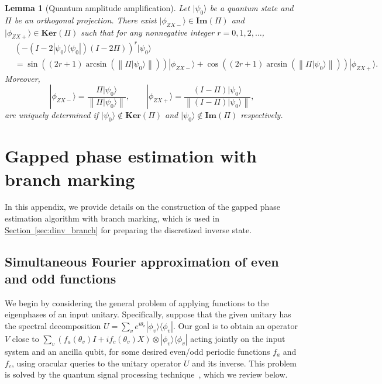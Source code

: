 \documentclass[letterpaper,onecolumn,11pt,accepted=2026-02-14]{quantumarticle}
\newcommand{\norm}[1]{\left\lVert#1\right\rVert}
\theoremstyle{remark}
\theoremstyle{plain}
\newtheorem*{lemma*}{Lemma}
\renewcommand{\sec}[1]{\hyperref[sec:#1]{Section~\ref*{sec:#1}}}
\newcommand{\ket}[1]{|#1\rangle}
\newcommand{\bra}[1]{\langle#1|}
\newcommand{\ketbra}[2]{\ket{#1}\!\bra{#2}}
\begin{document}
\begin{lemma*}[Quantum amplitude amplification]
Let $\ket{\psi_0}$ be a quantum state and $\Pi$ be an orthogonal projection. There exist $\ket{\phi_{ZX-}}\in\mathbf{Im}(\Pi)$ and $\ket{\phi_{ZX+}}\in\mathbf{Ker}(\Pi)$ such that for any nonnegative integer $r=0,1,2,\ldots$,
\begin{equation*}
\begin{aligned}
    &\left(-(I-2\ketbra{\psi_0}{\psi_0})(I-2\Pi)\right)^r\ket{\psi_0}\\
    &=\sin\left((2r+1)\arcsin(\norm{\Pi\ket{\psi_0}})\right)\ket{\phi_{ZX-}}
    +\cos\left((2r+1)\arcsin(\norm{\Pi\ket{\psi_0}})\right)\ket{\phi_{ZX+}}.
\end{aligned}
\end{equation*}
Moreover, 
\begin{equation*}
    \ket{\phi_{ZX-}}=\frac{\Pi\ket{\psi_0}}{\norm{\Pi\ket{\psi_0}}},\qquad
    \ket{\phi_{ZX+}}=\frac{(I-\Pi)\ket{\psi_0}}{\norm{(I-\Pi)\ket{\psi_0}}},
\end{equation*}
are uniquely determined if $\ket{\psi_0}\notin\mathbf{Ker}(\Pi)$ and $\ket{\psi_0}\notin\mathbf{Im}(\Pi)$ respectively.


\end{lemma*}

\section{Gapped phase estimation with branch marking}
\label{append:gpe_bm}

In this appendix, we provide details on the construction of the gapped phase estimation algorithm with branch marking, which is used in \sec{dinv_branch} for preparing the discretized inverse state.

\subsection{Simultaneous Fourier approximation of even and odd functions}
\label{append:gpe_bm_fourier}
We begin by considering the general problem of applying functions to the eigenphases of an input unitary. Specifically, suppose that the given unitary has the spectral decomposition $U=\sum_ve^{i\theta_v}\ketbra{\phi_v}{\phi_v}$. Our goal is to obtain an operator $V$ close to $\sum_v \left(f_a(\theta_v)I+if_c(\theta_v)X\right)\otimes\ketbra{\phi_v}{\phi_v}$ acting jointly on the input system and an ancilla qubit, for some desired even/odd periodic functions $f_a$ and $f_c$, using oracular queries to the unitary operator $U$ and its inverse. This problem is solved by the quantum signal processing technique~\cite{Low2016HamSim,MethodologyLYC}, which we review below.
\end{document}

